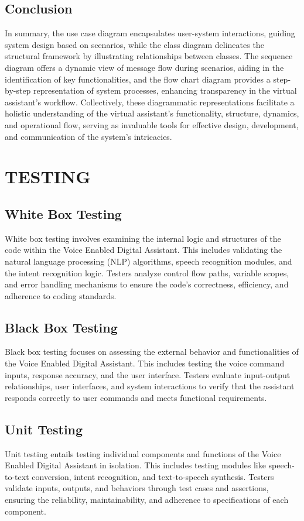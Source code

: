 \documentclass[12pt,a4paper]{report}
\begin{document}
\section{Conclusion}
In summary, the use case diagram encapsulates user-system interactions, guiding system design based on scenarios, while the class diagram delineates the structural framework by illustrating relationships between classes. The sequence diagram offers a dynamic view of message flow during scenarios, aiding in the identification of key functionalities, and the flow chart diagram provides a step-by-step representation of system processes, enhancing transparency in the virtual assistant's workflow. Collectively, these diagrammatic representations facilitate a holistic understanding of the virtual assistant's functionality, structure, dynamics, and operational flow, serving as invaluable tools for effective design, development, and communication of the system's intricacies.
\newpage
\chapter{TESTING}
\section{White Box Testing}
White box testing involves examining the internal logic and structures of the code within the Voice Enabled Digital Assistant. This includes validating the natural language processing (NLP) algorithms, speech recognition modules, and the intent recognition logic. Testers analyze control flow paths, variable scopes, and error handling mechanisms to ensure the code's correctness, efficiency, and adherence to coding standards.

\section{Black Box Testing}
Black box testing focuses on assessing the external behavior and functionalities of the Voice Enabled Digital Assistant. This includes testing the voice command inputs, response accuracy, and the user interface. Testers evaluate input-output relationships, user interfaces, and system interactions to verify that the assistant responds correctly to user commands and meets functional requirements.

\section{Unit Testing}
Unit testing entails testing individual components and functions of the Voice Enabled Digital Assistant in isolation. This includes testing modules like speech-to-text conversion, intent recognition, and text-to-speech synthesis. Testers validate inputs, outputs, and behaviors through test cases and assertions, ensuring the reliability, maintainability, and adherence to specifications of each component.
\end{document}
